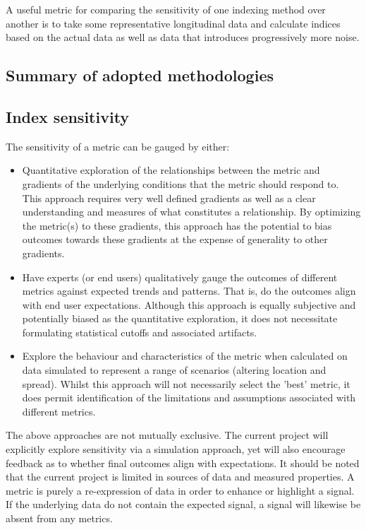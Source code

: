 A useful metric for comparing the sensitivity of one indexing method over another is to take some
representative longitudinal data and calculate indices based on the actual data as well as data that
introduces progressively more noise.

 


                                         
\clearpage

\subsection{Summary of adopted methodologies}

\subsection{Index sensitivity}\label{sec:indexSensitivity}

The sensitivity of a metric can be gauged by either:
\begin{itemize}
\item Quantitative exploration of the relationships between the metric and gradients of the
underlying conditions that the metric should respond to. This approach requires very well defined
gradients as well as a clear understanding and measures of what constitutes a relationship.  By
optimizing the metric(s) to these gradients, this approach has the potential to bias outcomes
towards these gradients at the expense of generality to other gradients.
\item Have experts (or end users) qualitatively gauge the outcomes of different metrics against
expected trends and patterns.  That is, do the outcomes align with end user expectations.  Although
this approach is equally subjective and potentially biased as the quantitative exploration, it does
not necessitate formulating statistical cutoffs and associated artifacts.
\item Explore the behaviour and characteristics of the metric when calculated on data simulated to
represent a range of scenarios (altering location and spread).  Whilst this approach will not
necessarily select the 'best' metric, it does permit identification of the limitations and
assumptions associated with different metrics.
\end{itemize}

The above approaches are not mutually exclusive.  The current project will explicitly explore
sensitivity via a simulation approach, yet will also encourage feedback as to whether final outcomes
align with expectations.  It should be noted that the current project is limited in sources of data
and measured properties.  A metric is purely a re-expression of data in order to enhance or
highlight a signal.  If the underlying data do not contain the expected signal, a signal will
likewise be absent from any metrics.

